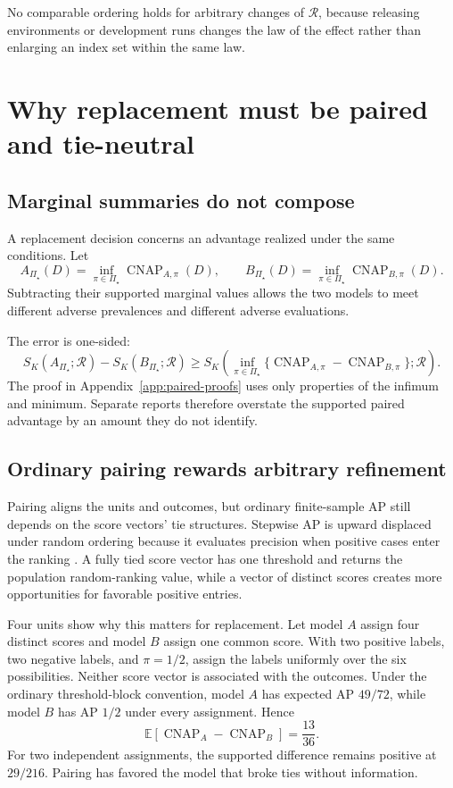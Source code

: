 \documentclass[11pt]{article}
\newcommand{\CNAP}{\operatorname{CNAP}}
\newcommand{\Regime}{\mathcal{R}}
\newcommand{\PSet}{\Pi_\star}
\newcommand{\E}{\mathbb{E}}
\theoremstyle{remark}
\begin{document}
No comparable ordering holds for arbitrary changes of $\Regime$, because releasing environments or development runs changes the law of the effect rather than enlarging an index set within the same law.

\section{Why replacement must be paired and tie-neutral}
\label{sec:paired}

\subsection{Marginal summaries do not compose}

A replacement decision concerns an advantage realized under the same conditions. Let
\[
A_{\PSet}(D)
=
\inf_{\pi\in\PSet}\CNAP_{A,\pi}(D),
\qquad
B_{\PSet}(D)
=
\inf_{\pi\in\PSet}\CNAP_{B,\pi}(D).
\]
Subtracting their supported marginal values allows the two models to meet different adverse prevalences and different adverse evaluations.

The error is one-sided:
\begin{equation}
S_K(A_{\PSet};\Regime)
-
S_K(B_{\PSet};\Regime)
\geq
S_K\left(
\inf_{\pi\in\PSet}
\{\CNAP_{A,\pi}-\CNAP_{B,\pi}\};
\Regime
\right).
\label{eq:noncomposition}
\end{equation}
The proof in Appendix~\ref{app:paired-proofs} uses only properties of the infimum and minimum. Separate reports therefore overstate the supported paired advantage by an amount they do not identify.

\subsection{Ordinary pairing rewards arbitrary refinement}

Pairing aligns the units and outcomes, but ordinary finite-sample AP still depends on the score vectors' tie structures. Stepwise AP is upward displaced under random ordering because it evaluates precision when positive cases enter the ranking \cite{bestgen2015random}. A fully tied score vector has one threshold and returns the population random-ranking value, while a vector of distinct scores creates more opportunities for favorable positive entries.

Four units show why this matters for replacement. Let model $A$ assign four distinct scores and model $B$ assign one common score. With two positive labels, two negative labels, and $\pi=1/2$, assign the labels uniformly over the six possibilities. Neither score vector is associated with the outcomes. Under the ordinary threshold-block convention, model $A$ has expected AP $49/72$, while model $B$ has AP $1/2$ under every assignment. Hence
\[
\E[\CNAP_A-\CNAP_B]
=
\frac{13}{36}.
\]
For two independent assignments, the supported difference remains positive at $29/216$. Pairing has favored the model that broke ties without information.
\end{document}
